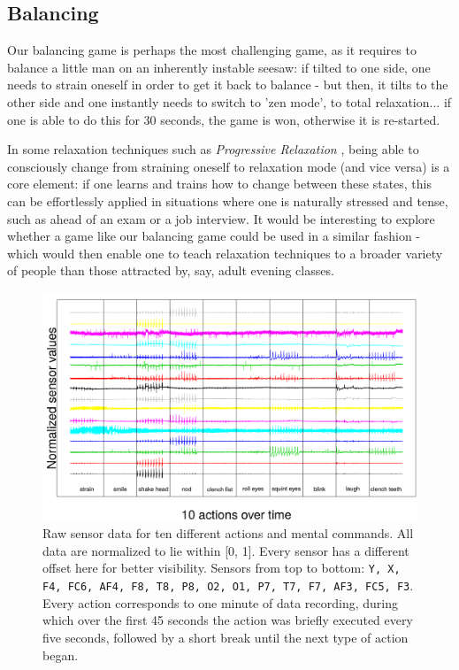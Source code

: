 \documentclass{utue} %
\begin{document}
\subsection{Balancing}
Our balancing game is perhaps the most challenging game, as it requires to balance a little man on an inherently instable seesaw: if tilted to one side, one needs to strain oneself in order to get it back to balance - but then, it tilts to the other side and one instantly needs to switch to 'zen mode', to total relaxation... if one is able to do this for 30 seconds, the game is won, otherwise it is re-started.

In some relaxation techniques such as \textit{Progressive Relaxation} \cite{Jacobson1938}, being able to consciously change from straining oneself to relaxation mode (and vice versa) is a core element: if one learns and trains how to change between these states, this can be effortlessly applied in situations where one is naturally stressed and tense, such as ahead of an exam or a job interview. It would be interesting to explore whether a game like our balancing game could be used in a similar fashion - which would then enable one to teach relaxation techniques to a broader variety of people than those attracted by, say, adult evening classes.




\begin{figure}[h!]
	\centering
	\includegraphics[width=1.0\textwidth]{images/sensor_values.png}
	\caption{Raw sensor data for ten different actions and mental commands. All data are normalized to lie within [0, 1]. Every sensor has a different offset here for better visibility. Sensors from top to bottom: \texttt{Y, X, F4, FC6, AF4, F8, T8, P8, O2, O1, P7, T7, F7, AF3, FC5, F3}. Every action corresponds to one minute of data recording, during which over the first 45 seconds the action was briefly executed every five seconds, followed by a short break until the next type of action began.}
	\label{fig:sensor_values}
\end{figure}
\end{document}
